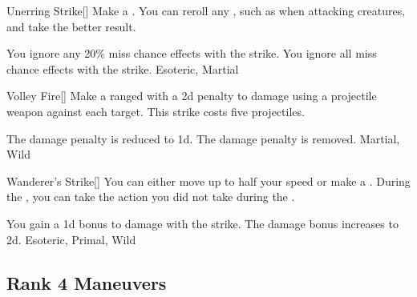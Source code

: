 \lowercase{\hypertarget{maneuver:Unerring Strike}{}}\label{maneuver:Unerring Strike}
\hypertarget{maneuver:Unerring Strike}{}
\begin{freeability}[Rank 3]{Unerring Strike}[]
Make a .
You can reroll any , such as when attacking  creatures, and take the better result.

\rankline
{} You ignore any 20\% miss chance effects with the strike.
 You ignore all miss chance effects with the strike.
 Esoteric, Martial
\end{freeability}
\vspace{0.25em}



\lowercase{\hypertarget{maneuver:Volley Fire}{}}\label{maneuver:Volley Fire}
\hypertarget{maneuver:Volley Fire}{}
\begin{freeability}[Rank 3]{Volley Fire}[]
Make a ranged  with a \minus2d penalty to damage using a projectile weapon against each target.
This strike costs five projectiles.

\rankline
{} The damage penalty is reduced to \minus1d.
 The damage penalty is removed.
 Martial, Wild
\end{freeability}
\vspace{0.25em}



\lowercase{\hypertarget{maneuver:Wanderer's Strike}{}}\label{maneuver:Wanderer's Strike}
\hypertarget{maneuver:Wanderer's Strike}{}
\begin{freeability}[Rank 3]{Wanderer's Strike}[]
You can either move up to half your speed or make a .
During the , you can take the action you did not take during the .

\rankline
{} You gain a \plus1d bonus to damage with the strike.
 The damage bonus increases to \plus2d.
 Esoteric, Primal, Wild
\end{freeability}
\vspace{0.25em}


\subsection{Rank 4 Maneuvers}

